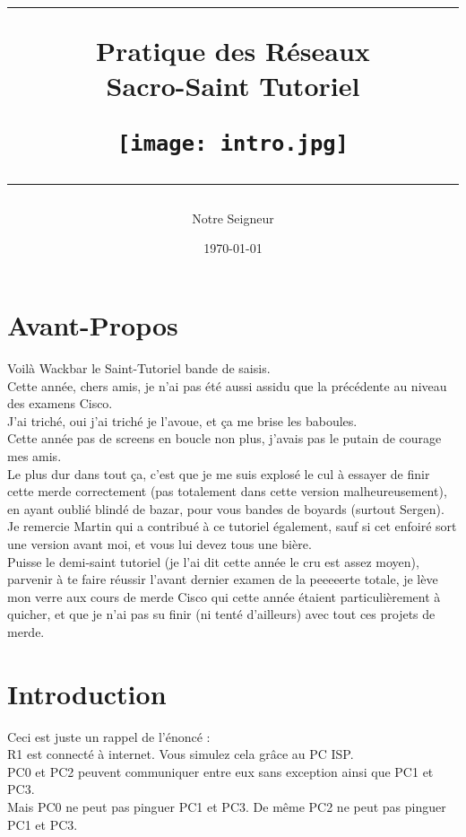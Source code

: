 \documentclass[a4paper,10pt,final,fleqn]{article}
\title{
\parbox{15cm}
{ 
  \vspace{3cm}
	\begin{center}\sf\bfseries\Huge
		\rule{15cm}{1pt}
		\medskip
		Pratique des Réseaux \\
		\huge Sacro-Saint Tutoriel \\
        \begin{center}
		\texttt{[image: intro.jpg]}
		\end{center}
		\vspace{.5cm}
		\rule{15cm}{1pt}
	\end{center}
	\vspace{3cm}
 }}
\author{Notre Seigneur}
\date{\today}
\begin{document}
\maketitle


\newpage
\section{Avant-Propos}

	Voilà Wackbar le Saint-Tutoriel bande de saisis.\\

	Cette année, chers amis, je n'ai pas été aussi assidu que la précédente au niveau des examens Cisco.\\
	J'ai triché, oui j'ai triché je l'avoue, et ça me brise les baboules.\\
	Cette année pas de screens en boucle non plus, j'avais pas le putain de courage mes amis.\\

	Le plus dur dans tout ça, c'est que je me suis explosé le cul à essayer de finir cette merde correctement (pas totalement dans cette version malheureusement), en ayant oublié blindé de bazar, pour vous bandes de boyards (surtout Sergen).\\
	
	Je remercie Martin qui a contribué à ce tutoriel également, sauf si cet enfoiré sort une version avant moi, et vous lui devez tous une bière.\\
	
	Puisse le demi-saint tutoriel (je l'ai dit cette année le cru est assez moyen), parvenir à te faire réussir l'avant dernier examen de la peeeeerte totale, je lève mon verre aux cours de merde Cisco qui cette année étaient particulièrement à quicher, et que je n'ai pas su finir (ni tenté d'ailleurs) avec tout ces projets de merde.\\

\section{Introduction}

	Ceci est juste un rappel de l'énoncé : \\

	R1 est connecté à internet. Vous simulez cela grâce au PC ISP.\\
	PC0 et PC2 peuvent communiquer entre eux sans exception ainsi que PC1 et PC3.\\
	Mais PC0 ne peut pas pinguer PC1 et PC3. De même PC2 ne peut pas pinguer PC1 et PC3.\\
\end{document}
